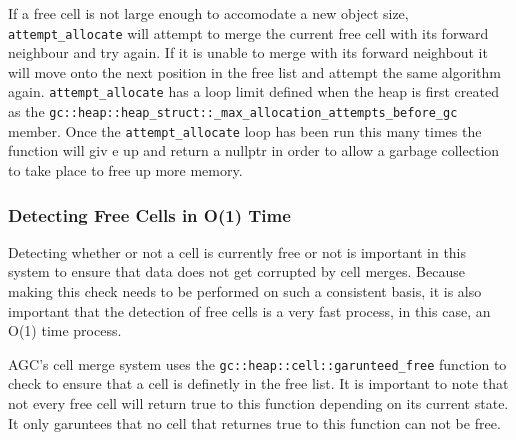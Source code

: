 \documentclass[11pt]{article}
\begin{document}
If a free cell is not large enough to accomodate a new object size, \texttt{attempt\_allocate} will attempt to merge the current
free cell with its forward neighbour and try again. If it is unable to merge with its forward neighbout it will move onto the
next position in the free list and attempt the same algorithm again. \texttt{attempt\_allocate} has a loop limit 
defined when the heap is first created as the \texttt{gc::heap::heap\_struct::\_max\_allocation\_attempts\_before\_gc} member.
Once the \texttt{attempt\_allocate} loop has been run this many times the function will giv e up and return a nullptr in order to allow a
garbage collection to take place to free up more memory.
\subsubsection{Detecting Free Cells in O(1) Time}
\label{sec:orgf17289b}
Detecting whether or not a cell is currently free or not is important in this system to ensure that data does not get corrupted by cell
merges. Because making this check needs to be performed on such a consistent basis, it is also important that the detection
of free cells is a very fast process, in this case, an O(1) time process.

AGC's cell merge system uses the \texttt{gc::heap::cell::garunteed\_free} function to check to ensure that a cell is definetly in the free
list. It is important to note that not every free cell will return true to this function depending on its current
state. It only garuntees that no cell that returnes true to this function can not be free.
\end{document}

